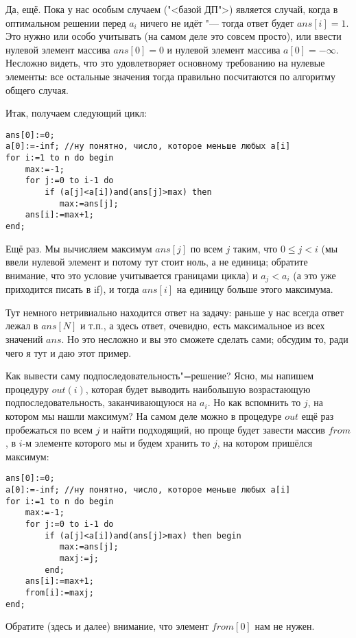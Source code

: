 Да, ещё. Пока у нас особым случаем ("<базой ДП">) является случай, когда в оптимальном решении перед $a_i$ ничего не идёт "--- тогда ответ будет $ans[i]=1$. Это нужно или особо учитывать (на самом деле это совсем просто), или ввести нулевой элемент массива $ans[0]=0$ и нулевой элемент массива $a[0]=-\infty$. Несложно видеть, что это удовлетворяет основному требованию на нулевые элементы: все остальные значения тогда правильно посчитаются по алгоритму общего случая.

Итак, получаем следующий цикл:
\begin{codesampleo}\begin{verbatim}
ans[0]:=0;
a[0]:=-inf; //ну понятно, число, которое меньше любых a[i]
for i:=1 to n do begin
    max:=-1; 
    for j:=0 to i-1 do
        if (a[j]<a[i])and(ans[j]>max) then
           max:=ans[j];
    ans[i]:=max+1;
end;
\end{verbatim}\end{codesampleo}
Ещё раз. Мы вычисляем максимум $ans[j]$ по всем $j$ таким, что $0\leq j<i$ (мы ввели нулевой элемент и потому тут стоит ноль, а не единица; обратите внимание, что это условие учитывается границами цикла) и $a_j<a_i$ (а это уже приходится писать в if), и тогда $ans[i]$ на единицу больше этого максимума.

Тут немного нетривиально находится ответ на задачу: раньше у нас всегда ответ лежал в $ans[N]$ и т.п., а здесь ответ, очевидно, есть максимальное из всех значений $ans$. Но это несложно и вы это сможете сделать сами; обсудим то, ради чего я тут и даю этот пример.

Как вывести саму подпоследовательность"=решение? Ясно, мы напишем процедуру $out(i)$, которая будет выводить наибольшую возрастающую подпоследовательность, заканчивающуюся на $a_i$. Но как вспомнить то $j$, на котором мы нашли максимум? На самом деле можно в процедуре $out$ ещё раз пробежаться по всем $j$ и найти подходящий, но проще будет завести массив $from$, в $i$-м элементе которого мы и будем хранить то $j$, на котором пришёлся максимум:
\begin{codesampleo}\begin{verbatim}
ans[0]:=0;
a[0]:=-inf; //ну понятно, число, которое меньше любых a[i]
for i:=1 to n do begin
    max:=-1; 
    for j:=0 to i-1 do
        if (a[j]<a[i])and(ans[j]>max) then begin
           max:=ans[j];
           maxj:=j;
        end;
    ans[i]:=max+1;
    from[i]:=maxj;
end;
\end{verbatim}\end{codesampleo}
Обратите (здесь и далее) внимание, что элемент $from[0]$ нам не нужен.

